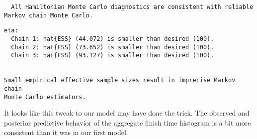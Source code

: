 \documentclass[
  letterpaper,
  DIV=11,
  numbers=noendperiod]{scrartcl}
\newenvironment{Shaded}{\begin{snugshade}}{\end{snugshade}}
\newcommand{\AttributeTok}[1]{\textcolor[rgb]{0.40,0.45,0.13}{#1}}
\newcommand{\ConstantTok}[1]{\textcolor[rgb]{0.56,0.35,0.01}{#1}}
\newcommand{\FunctionTok}[1]{\textcolor[rgb]{0.28,0.35,0.67}{#1}}
\newcommand{\NormalTok}[1]{\textcolor[rgb]{0.00,0.23,0.31}{#1}}
\newcommand{\OtherTok}[1]{\textcolor[rgb]{0.00,0.23,0.31}{#1}}
\newcommand{\SpecialCharTok}[1]{\textcolor[rgb]{0.37,0.37,0.37}{#1}}
\newcommand{\StringTok}[1]{\textcolor[rgb]{0.13,0.47,0.30}{#1}}
\begin{document}
\begin{Shaded}
\end{Shaded}

\begin{verbatim}
  All Hamiltonian Monte Carlo diagnostics are consistent with reliable
Markov chain Monte Carlo.
\end{verbatim}

\begin{Shaded}
\end{Shaded}

\begin{verbatim}
eta:
  Chain 1: hat{ESS} (44.072) is smaller than desired (100).
  Chain 2: hat{ESS} (73.652) is smaller than desired (100).
  Chain 3: hat{ESS} (93.127) is smaller than desired (100).


Small empirical effective sample sizes result in imprecise Markov chain
Monte Carlo estimators.
\end{verbatim}

It looks like this tweak to our model may have done the trick. The
observed and posterior predictive behavior of the aggregate finish time
histogram is a bit more consistent than it was in our first model.
\end{document}
